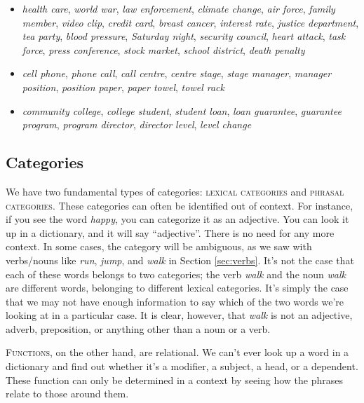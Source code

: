 \begin{itemize}[noitemsep]
    \item \textit{health care}, \textit{world war}, \textit{law enforcement}, \textit{climate change}, \textit{air force}, \textit{family member}, \textit{video clip}, \textit{credit card}, \textit{breast cancer}, \textit{interest rate}, \textit{justice department}, \textit{tea party}, \textit{blood pressure}, \textit{Saturday night}, \textit{security council}, \textit{heart attack}, \textit{task force}, \textit{press conference}, \textit{stock market}, \textit{school district}, \textit{death penalty}
    \item \textit{cell phone}, \textit{phone call}, \textit{call centre}, \textit{centre stage}, \textit{stage manager}, \textit{manager position}, \textit{position paper}, \textit{paper towel}, \textit{towel rack}
    \item \textit{community college}, \textit{college student}, \textit{student loan}, \textit{loan guarantee}, \textit{guarantee program}, \textit{program director}, \textit{director level}, \textit{level change}
\end{itemize}

\subsection{Categories}

We have two fundamental types of categories: \textsc{lexical categories} and \textsc{phrasal categories}. These categories can often be identified out of context. For instance, if you see the word \textit{happy}, you can categorize it as an adjective. You can look it up in a dictionary, and it will say ``adjective''. There is no need for any more context. In some cases, the category will be ambiguous, as we saw with verbs/nouns like \textit{run}, \textit{jump}, and \textit{walk} in Section \ref{sec:verbs}. It's not the case that each of these words belongs to two categories; the verb \textit{walk} and the noun \textit{walk} are different words, belonging to different lexical categories. It's simply the case that we may not have enough information to say which of the two words we're looking at in a particular case. It is clear, however, that \textit{walk} is not an adjective, adverb, preposition, or anything other than a noun or a verb.

\textsc{Functions}, on the other hand, are relational. We can't ever look up a word in a dictionary and find out whether it's a modifier, a subject, a head, or a dependent. These function can only be determined in a context by seeing how the phrases relate to those around them.

